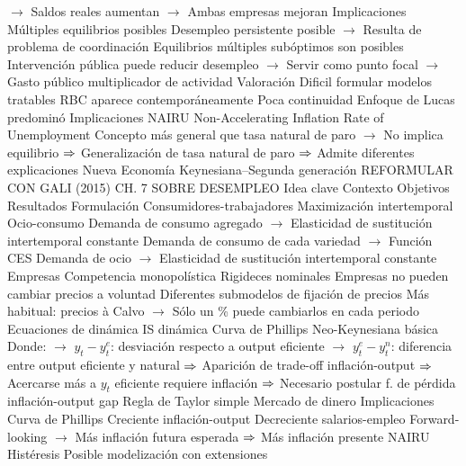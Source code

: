 \documentclass{nuevotema}
\begin{document}
\begin{esquemal}
				\4[] $\to$ Saldos reales aumentan
				\4[] $\to$ Ambas empresas mejoran
				\4 Implicaciones
				\4[] Múltiples equilibrios posibles
				\4[] Desempleo persistente posible
				\4[] $\to$ Resulta de problema de coordinación
				\4[] Equilibrios múltiples subóptimos son posibles
				\4[] Intervención pública puede reducir desempleo
				\4[] $\to$ Servir como punto focal
				\4[] $\to$ Gasto público multiplicador de actividad
				\4 Valoración
				\4[] Dificil formular modelos tratables
				\4[] RBC aparece contemporáneamente
				\4[] Poca continuidad
				\4[] Enfoque de Lucas predominó
			\3 Implicaciones
				\4 NAIRU
				\4[] Non-Accelerating Inflation Rate of Unemployment
				\4[] Concepto más general que tasa natural de paro
				\4[] $\to$ No implica equilibrio
				\4[] $\Rightarrow$ Generalización de tasa natural de paro
				\4[] $\Rightarrow$ Admite diferentes explicaciones
		\2 Nueva Economía Keynesiana--Segunda generación
			\3 REFORMULAR CON GALI (2015) CH. 7  SOBRE DESEMPLEO
			\3 Idea clave
				\4 Contexto
				\4 Objetivos
				\4 Resultados
			\3 Formulación
				\4 Consumidores-trabajadores
				\4[] Maximización intertemporal
				\4[] Ocio-consumo
				\4[] Demanda de consumo agregado
				\4[] $\to$ Elasticidad de sustitución intertemporal constante
				\4[] Demanda de consumo de cada variedad
				\4[] $\to$ Función CES
				\4[] Demanda de ocio
				\4[] $\to$ Elasticidad de sustitución intertemporal constante
				\4 Empresas
				\4[] Competencia monopolística
				\4 Rigideces nominales
				\4[] Empresas no pueden cambiar precios a voluntad
				\4[] Diferentes submodelos de fijación de precios
				\4[] Más habitual: precios à Calvo
				\4[] $\to$ Sólo un \% puede cambiarlos en cada periodo
				\4 Ecuaciones de dinámica
				\4[DIS] IS dinámica
				\4[] 
				\4[NKPC] Curva de Phillips Neo-Keynesiana básica
				\4[] 
				\4[] 
				\4[] 
				\4[] Donde:
				\4[] $\to$ $y_t - y^e_t$: desviación respecto a output eficiente
				\4[] $\to$ $y^e_t - y^n_t$: diferencia entre output eficiente y natural
				\4[] $\Rightarrow$ Aparición de trade-off inflación-output
				\4[] $\Rightarrow$ Acercarse más a $y_t$ eficiente requiere inflación
				\4[] $\Rightarrow$ Necesario postular f. de pérdida inflación-output gap
				\4[TR] Regla de Taylor simple
				\4[] 
				\4[MP] Mercado de dinero
				\4[] 
			\3 Implicaciones
				\4 Curva de Phillips
				\4[] Creciente inflación-output
				\4[] Decreciente salarios-empleo
				\4[] Forward-looking
				\4[] $\to$ Más inflación futura esperada
				\4[] $\Rightarrow$ Más inflación presente
				\4 NAIRU
				\4[]
				\4 Histéresis
				\4[] Posible modelización con extensiones


\end{esquemal}
\end{document}
